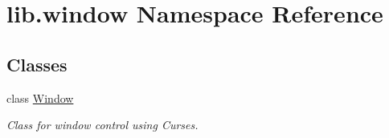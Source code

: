 \hypertarget{namespacelib_1_1window}{}\section{lib.\+window Namespace Reference}
\label{namespacelib_1_1window}
\subsection*{Classes}
\begin{DoxyCompactItemize}
\item 
class \hyperlink{classlib_1_1window_1_1_window}{Window}
\begin{DoxyCompactList}\small\item\em Class for window control using Curses. \end{DoxyCompactList}\end{DoxyCompactItemize}
